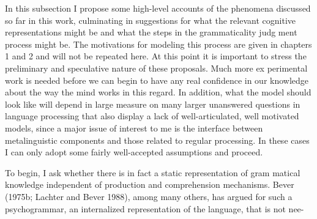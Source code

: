 \begin{styleTextbody}
In this subsection I propose some high-level accounts of the phenomena discussed so far in this work, culminating in suggestions for what the relevant cognitive representations might be and what the steps in the grammaticality judg\- ment process might be. The motivations for modeling this process are given in chapters 1 and 2 and will not be repeated here. At this point it is important to stress the preliminary and speculative nature of these proposals. Much more ex\- perimental work is needed before we can begin to have any real confidence in our knowledge about the way the mind works in this regard. In addition, what the model should look like will depend in large measure on many larger unanswered questions in language processing that also display a lack of well-articulated, well\- motivated models, since a major issue of interest to me is the interface between metalinguistic components and those related to regular processing. In these cases I can only adopt some fairly well-accepted assumptions and proceed.
\end{styleTextbody}


\begin{styleTextbody}
To begin, I ask whether there is in fact a static representation of gram\- matical knowledge independent of production and comprehension mechanisms. Bever (1975b; Lachter and Bever 1988), among many others, has argued for such a psychogrammar, {\textquotedbl}an internalized representation of the language, that is not nee-
\end{styleTextbody}


